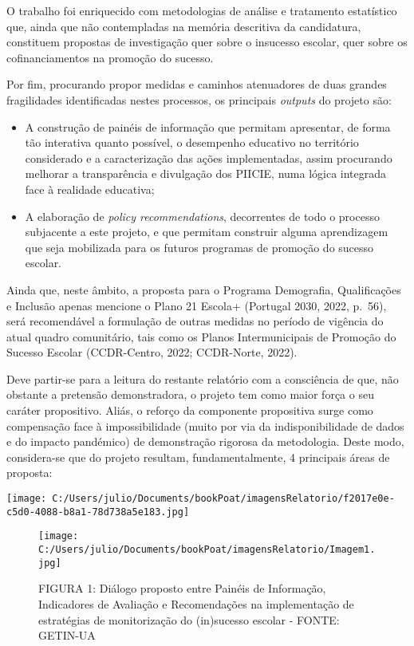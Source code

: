 \documentclass[
]{book}
\providecommand{\tightlist}{%
  \setlength{\itemsep}{0pt}\setlength{\parskip}{0pt}}
\begin{document}
O trabalho foi enriquecido com metodologias de análise e tratamento estatístico que, ainda que não contempladas na memória descritiva da candidatura, constituem propostas de investigação quer sobre o insucesso escolar, quer sobre os cofinanciamentos na promoção do sucesso.

Por fim, procurando propor medidas e caminhos atenuadores de duas grandes fragilidades identificadas nestes processos, os principais \emph{outputs} do projeto são:

\begin{itemize}
\tightlist
\item
  A construção de painéis de informação que permitam apresentar, de forma tão interativa quanto possível, o desempenho educativo no território considerado e a caracterização das ações implementadas, assim procurando melhorar a transparência e divulgação dos PIICIE, numa lógica integrada face à realidade educativa;
\item
  A elaboração de \emph{policy recommendations}, decorrentes de todo o processo subjacente a este projeto, e que permitam construir alguma aprendizagem que seja mobilizada para os futuros programas de promoção do sucesso escolar.
\end{itemize}

Ainda que, neste âmbito, a proposta para o Programa Demografia, Qualificações e Inclusão apenas mencione o Plano 21 Escola+ (Portugal 2030, 2022, p.~56), será recomendável a formulação de outras medidas no período de vigência do atual quadro comunitário, tais como os Planos Intermunicipais de Promoção do Sucesso Escolar (CCDR-Centro, 2022; CCDR-Norte, 2022).

Deve partir-se para a leitura do restante relatório com a consciência de que, não obstante a pretensão demonstradora, o projeto tem como maior força o seu caráter propositivo. Aliás, o reforço da componente propositiva surge como compensação face à impossibilidade (muito por via da indisponibilidade de dados e do impacto pandémico) de demonstração rigorosa da metodologia. Deste modo, considera-se que do projeto resultam, fundamentalmente, 4 principais áreas de proposta:

\texttt{[image: C:/Users/julio/Documents/bookPoat/imagensRelatorio/f2017e0e-c5d0-4088-b8a1-78d738a5e183.jpg]}

\begin{figure}
\centering
\texttt{[image: C:/Users/julio/Documents/bookPoat/imagensRelatorio/Imagem1.jpg]}
\caption{FIGURA 1: Diálogo proposto entre Painéis de Informação, Indicadores de Avaliação e Recomendações na implementação de estratégias de monitorização do (in)sucesso escolar - FONTE: GETIN-UA}
\end{figure}
\end{document}
